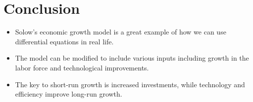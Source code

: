 \documentclass[11pt,a4paper]{article}
\begin{document}
	\section*{Conclusion}
	\begin{itemize}
		\item Solow’s economic growth model is a great example of how we can use differential equations in real life.
		\item The model can be modified to include various inputs including growth in the labor force and technological improvements.
		\item The key to short-run growth is increased investments, while technology and efficiency improve long-run growth.
	\end{itemize}
\end{document}
